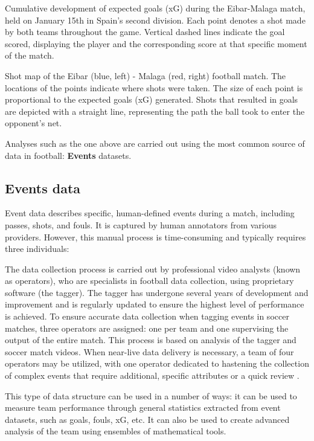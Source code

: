 \documentclass[twoside,nohyper]{tufte-book}
\begin{document}
Cumulative development of expected goals (xG) during the
Eibar-Malaga match, held on January 15th in Spain's second division.
Each point denotes a shot made by both teams throughout the game.
Vertical dashed lines indicate the goal scored, displaying the player
and the corresponding score at that specific moment of the match.

Shot map of the Eibar (blue, left) - Malaga (red, right)
football match. The locations of the points indicate where shots were
taken. The size of each point is proportional to the expected goals (xG)
generated. Shots that resulted in goals are depicted with a straight
line, representing the path the ball took to enter the opponent's
net.

Analyses such as the one above are carried out using the most common
source of data in football: \textbf{Events} datasets.

\hypertarget{events-data-1}{%
\subsection{Events data}\label{events-data-1}}

Event data describes specific, human-defined events during a match,
including passes, shots, and fouls. It is captured by human annotators
from various providers. However, this manual process is time-consuming
and typically requires three individuals:

The data collection process is carried out by professional video
analysts (known as operators), who are specialists in football data
collection, using proprietary software (the tagger). The tagger has
undergone several years of development and improvement and is regularly
updated to ensure the highest level of performance is achieved. To
ensure accurate data collection when tagging events in soccer matches,
three operators are assigned: one per team and one supervising the
output of the entire match. This process is based on analysis of the
tagger and soccer match videos. When near-live data delivery is
necessary, a team of four operators may be utilized, with one operator
dedicated to hastening the collection of complex events that require
additional, specific attributes or a quick review \citep{3}.

This type of data structure can be used in a number of ways: it can be
used to measure team performance through general statistics extracted
from event datasets, such as goals, fouls, xG, etc. It can also be used
to create advanced analysis of the team using ensembles of mathematical
tools.
\end{document}
